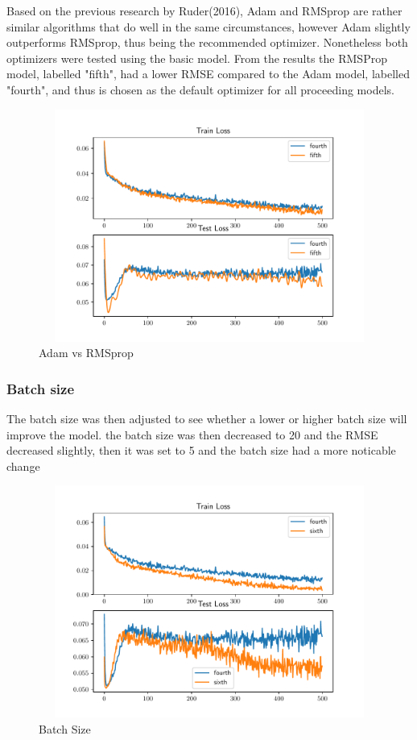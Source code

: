 \documentclass[10pt,11pt,12pt,oneside]{book}
\begin{document}
Based on the previous research by Ruder(2016), Adam
and RMSprop are rather similar algorithms that do well in the same circumstances, however Adam slightly outperforms RMSprop, thus being the recommended optimizer. \cite{DBLP:journals/corr/Ruder16} Nonetheless both optimizers were tested using the basic model. From the results the RMSProp model, labelled "fifth", had a lower RMSE compared to the Adam model, labelled "fourth", and thus is chosen as the default optimizer for all proceeding models.\\
\begin{figure}[H]
\centering
\includegraphics[width=5in,height=3in]{Data/optimizer.pdf}
\caption{Adam vs RMSprop}
\label{fig:basic}
\end{figure}
\subsubsection{Batch size}
The batch size was then adjusted to see whether a lower or higher batch size will improve the model. the batch size was then decreased to 20 and the RMSE decreased slightly, then it was set to 5 and the batch size had a more noticable change\\
\begin{figure}[H]
\centering
\includegraphics[width=5in,height=3in]{Data/batch_size.pdf}
\caption{Batch Size}
\label{fig:batch}
\end{figure}
\end{document}
